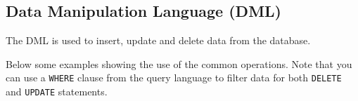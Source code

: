 \subsection{Data Manipulation Language (DML)}
The DML is used to insert, update and delete data from the database.

Below some examples showing the use of the common operations.
Note that you can use a \texttt{WHERE} clause from the query language to filter data for both \texttt{DELETE} and \texttt{UPDATE} statements.

